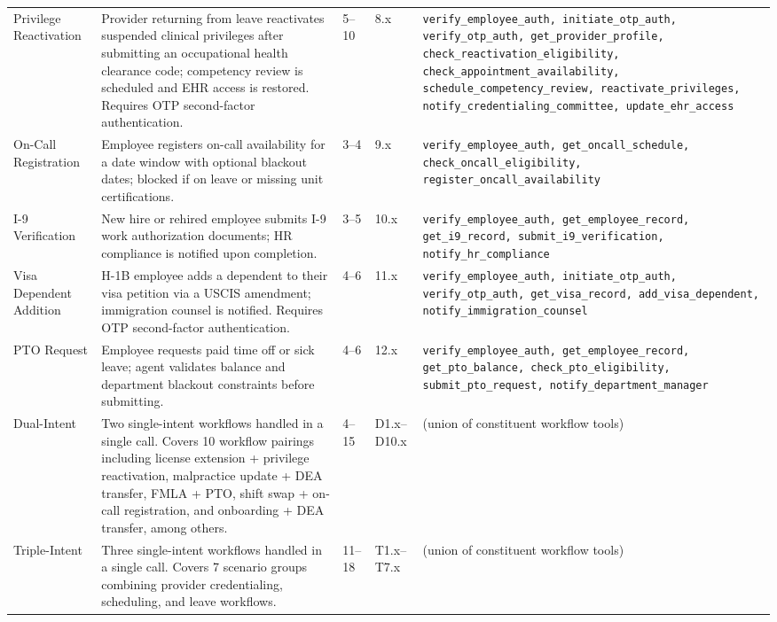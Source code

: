 {\begin{longtable}{
  p{}
  p{}
  p{}
  p{}
  p{}}
\addlinespace
Privilege Reactivation & Provider returning from leave reactivates suspended clinical privileges after submitting an occupational health clearance code; competency review is scheduled and EHR access is restored. Requires OTP second-factor authentication. & 5--10 & 8.x & \texttt{verify\_employee\_auth, initiate\_otp\_auth, verify\_otp\_auth, get\_provider\_profile, check\_reactivation\_eligibility, check\_appointment\_availability, schedule\_competency\_review, reactivate\_privileges, notify\_credentialing\_committee, update\_ehr\_access} \\
\addlinespace
On-Call Registration & Employee registers on-call availability for a date window with optional blackout dates; blocked if on leave or missing unit certifications. & 3--4 & 9.x & \texttt{verify\_employee\_auth, get\_oncall\_schedule, check\_oncall\_eligibility, register\_oncall\_availability} \\
\addlinespace
I-9 Verification & New hire or rehired employee submits I-9 work authorization documents; HR compliance is notified upon completion. & 3--5 & 10.x & \texttt{verify\_employee\_auth, get\_employee\_record, get\_i9\_record, submit\_i9\_verification, notify\_hr\_compliance} \\
\addlinespace
Visa Dependent Addition & H-1B employee adds a dependent to their visa petition via a USCIS amendment; immigration counsel is notified. Requires OTP second-factor authentication. & 4--6 & 11.x & \texttt{verify\_employee\_auth, initiate\_otp\_auth, verify\_otp\_auth, get\_visa\_record, add\_visa\_dependent, notify\_immigration\_counsel} \\
\addlinespace
PTO Request & Employee requests paid time off or sick leave; agent validates balance and department blackout constraints before submitting. & 4--6 & 12.x & \texttt{verify\_employee\_auth, get\_employee\_record, get\_pto\_balance, check\_pto\_eligibility, submit\_pto\_request, notify\_department\_manager} \\
\midrule
Dual-Intent & Two single-intent workflows handled in a single call. Covers 10 workflow pairings including license extension + privilege reactivation, malpractice update + DEA transfer, FMLA + PTO, shift swap + on-call registration, and onboarding + DEA transfer, among others. & 4--15 & D1.x--D10.x & (union of constituent workflow tools) \\
\addlinespace
Triple-Intent & Three single-intent workflows handled in a single call. Covers 7 scenario groups combining provider credentialing, scheduling, and leave workflows. & 11--18 & T1.x--T7.x & (union of constituent workflow tools) \\

\end{longtable}}
